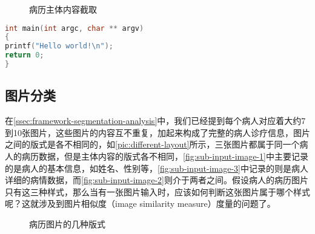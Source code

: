 \begin{figure}[htbp]
  \centering
  \caption{病历主体内容截取}
  \label{pic:different-layout}
\end{figure}

\begin{lstlisting}[language=C]
int main(int argc, char ** argv)
{
printf("Hello world!\n");
return 0;
}
\end{lstlisting}

\subsection{图片分类}
在\autoref{ssec:framework-segmentation-analysis}中，我们已经提到每个病人对应着大约7到10张图片，这些图片的内容互不重复，加起来构成了完整的病人诊疗信息，图片之间的版式是各不相同的，如\autoref{pic:different-layout}所示，三张图片都属于同一个病人的病历数据，但是主体内容的版式各不相同，\autoref{fig:sub-input-image-1}中主要记录的是病人的基本信息，如姓名、性别等，\autoref{fig:sub-input-image-3}中记录的则是病人详细的病情数据，而\autoref{fig:sub-input-image-2}则介于两者之间。假设病人的病历图片只有这三种样式，那么当有一张图片输入时，应该如何判断这张图片属于哪个样式呢？这就涉及到图片相似度（image similarity measure）度量的问题了。

\begin{figure}[htbp]
  \centering
  \caption{病历图片的几种版式}
  \label{pic:different-layout}
\end{figure}


